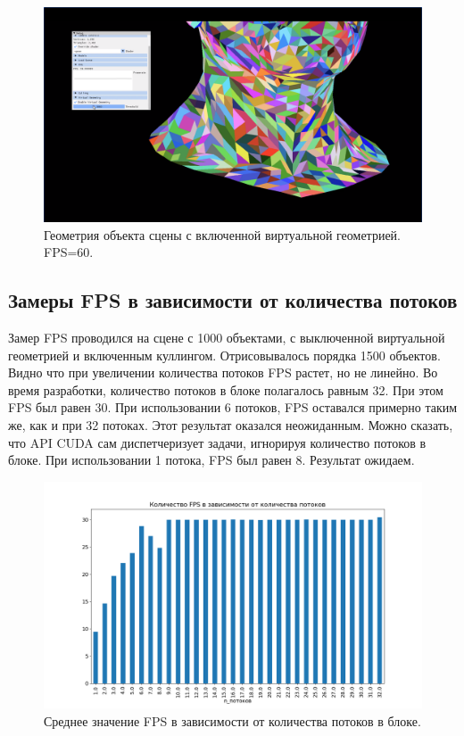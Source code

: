 \begin{figure}[ph!]
	\centering
	\includegraphics[width=0.95\linewidth]{inc/img/vgeom_on.png}
	\caption{Геометрия объекта сцены с включенной виртуальной геометрией. FPS=60.}
\end{figure}

\pagebreak

\subsection{Замеры FPS в зависимости от количества потоков} 

Замер FPS проводился на сцене с 1000 объектами, с выключенной виртуальной геометрией и включенным куллингом.
Отрисовывалось порядка 1500 объектов. Видно что при увеличении количества потоков FPS растет, но не линейно.
Во время разработки, количество потоков в блоке полагалось равным 32. При этом FPS был равен 30. 
При использовании 6 потоков, FPS оставался примерно таким же, как и при 32 потоках. Этот результат оказался неожиданным. Можно сказать, что 
API CUDA сам диспетчеризует задачи, игнорируя количество потоков в блоке. 
При использовании 1 потока, FPS был равен 8. Результат ожидаем.

\begin{figure}[ph!]
	\centering
	\includegraphics[width=0.95\linewidth]{inc/img/fps_per_threads_2.png}
	\caption{Среднее значение FPS в зависимости от количества потоков в блоке.}
\end{figure}

